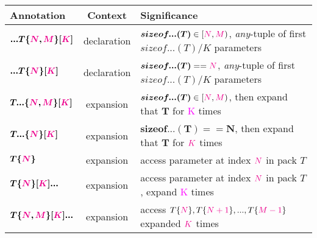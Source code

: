 \begin{tabularx}{\textwidth}{l|c|X}
  \textbf{Annotation} & \textbf{Context}  &\textbf{Significance} \\
\hline
$\bm{...T\{\textcolor{Magenta}{\textcolor{Magenta}{N}},\textcolor{Magenta}{M}\}[\textcolor{Magenta}{K}]}$ & declaration & $\bm{sizeof...(T)} \in [\textcolor{Magenta}{N},\textcolor{Magenta}{M})$, \textit{any}-tuple of first $sizeof...(T)/K$ parameters \\
$\bm{...T\{\textcolor{Magenta}{N}\}[\textcolor{Magenta}{K}]}$ & declaration & $\bm{sizeof...(T)} == \textcolor{Magenta}{N}$, \textit{any}-tuple of first $sizeof...(T)/K$ parameters \\
$\bm{T...\{\textcolor{Magenta}{N},\textcolor{Magenta}{M}\}[\textcolor{Magenta}{K}]}$ & expansion & $\bm{sizeof...(T)} \in [\textcolor{Magenta}{N},\textcolor{Magenta}{M})$, then expand that ${\bm{T}}$ for \textcolor{Magenta}{K} times   \\
$\bm{T...\{\textcolor{Magenta}{N}\}[\textcolor{Magenta}{K}]}$ & expansion & $\bm{sizeof...(T) == N}$, then expand that ${\bm{T}}$ for $\textcolor{Magenta}{K}$ times\\
$\bm{T\{\textcolor{Magenta}{N}\}}$ & expansion & access parameter at index $\textcolor{Magenta}{N}$ in pack $T$ \\
$\bm{T\{\textcolor{Magenta}{N}\}[\textcolor{Magenta}{K}]...}$ & expansion & access parameter at index $\textcolor{Magenta}{N}$ in pack $T$, expand \textcolor{Magenta}{K} times\\
$\bm{T\{\textcolor{Magenta}{N},\textcolor{Magenta}{M}\}[\textcolor{Magenta}{K}]...}$ & expansion & access $T\{\textcolor{Magenta}{N}\},T\{\textcolor{Magenta}{N+1}\},...,T\{\textcolor{Magenta}{M-1}\}$ expanded $\textcolor{Magenta}{K}$ times \\
\end{tabularx}

